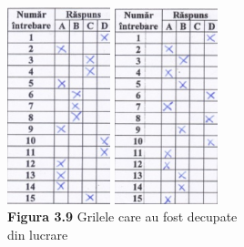 \documentclass[a4paper,12pt]{report}
\begin{document}
\begin {center} 
	\begin {footnotesize} 
		\includegraphics[width = 30mm]{fig3_9_1} 
		\includegraphics[width = 30mm]{fig3_9_2} \\
		\textbf  {Figura 3.9} Grilele care au fost decupate \\ din lucrare
	\end {footnotesize} 
\end {center}
\end{document}
